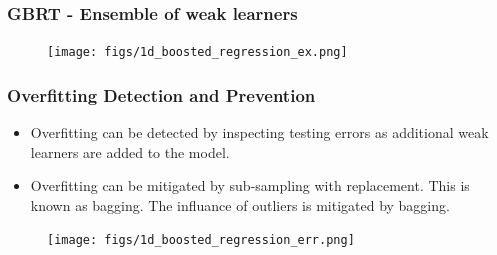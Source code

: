 \documentclass[t, pdftex]{beamer}
\begin{document}
\begin{frame}
\frametitle{GBRT - Ensemble of weak learners}

\begin{figure}[!htbp]
\centering
\texttt{[image: figs/1d\_boosted\_regression\_ex.png]}
\label{model_overview}
\end{figure}
\end{frame}

\begin{frame}[shrink=10]
\frametitle{Overfitting Detection and Prevention}
\begin{itemize}
\item Overfitting can be detected by inspecting testing errors as additional weak learners are added to the model.
\item Overfitting can be mitigated by sub-sampling with replacement.  This is known as bagging.  The influance of outliers is mitigated by bagging.
\end{itemize}
\begin{figure}[!htbp]
\centering
\texttt{[image: figs/1d\_boosted\_regression\_err.png]}
\label{model_overview}
\end{figure}
\end{frame}
\end{document}
